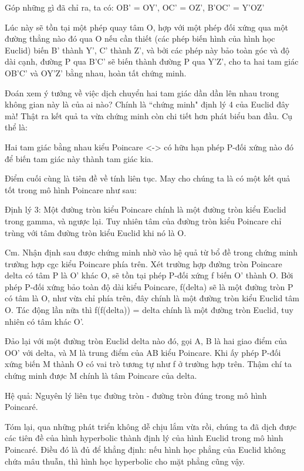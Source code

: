 \begin{multicols}{2}
	Góp những gì đã chỉ ra, ta có: OB' = OY', OC' = OZ', B'OC' = Y'OZ'
	
	Lúc này sẽ tồn tại một phép quay tâm O, hợp với một phép đối xứng qua một đường thẳng nào đó qua O nếu cần thiết (các phép biến hình của hình học Euclid) biến B' thành Y', C' thành Z', và bởi các phép này bảo toàn góc và độ dài cạnh, đường P qua B'C' sẽ biến thành đường P qua Y'Z', cho ta hai tam giác OB'C' và OY'Z' bằng nhau, hoàn tất chứng minh.
	
	Đoán xem ý tưởng về việc dịch chuyển hai tam giác dần dần lên nhau trong không gian này là của ai nào? Chính là ``chứng minh" định lý 4 của Euclid đây mà!
	Thật ra kết quả ta vừa chứng minh còn chi tiết hơn phát biểu ban đầu. Cụ thể là:
	
	Hai tam giác bằng nhau kiểu Poincare <-> có hữu hạn phép P-đối xứng nào đó để biến tam giác này thành tam giác kia.
	
	
	Điểm cuối cùng là tiên đề về tính liên tục. May cho chúng ta là có một kết quả tốt trong mô hình Poincare như sau:
	
	Định lý 3: Một đường tròn kiểu Poincare chính là một đường tròn kiểu Euclid trong gamma, và ngược lại. Tuy nhiên tâm của đường tròn kiểu Poincare chỉ trùng với tâm đường tròn kiểu Euclid khi nó là O.
	
	Cm. Nhận định sau được chứng minh nhờ vào hệ quả từ bổ đề trong chứng minh trường hợp cgc kiểu Poincare phía trên. 
	Xét trường hợp đường tròn Poincare delta có tâm P là O' khác O, sẽ tồn tại phép P-đối xứng f biến O' thành O. Bởi phép P-đối xứng bảo toàn độ dài kiểu Poincare, f(delta) sẽ là một đường tròn P có tâm là O, như vừa chỉ phía trên, đây chính là một đường tròn kiểu Euclid tâm O. Tác động lần nữa thì f(f(delta)) = delta chính là một đường tròn Euclid, tuy nhiên có tâm khác O'.
	
	Đảo lại với một đường tròn Euclid delta nào đó, gọi A, B là hai giao điểm của OO' với delta, và M là trung điểm của AB kiểu Poincare. Khi ấy phép P-đối xứng biến M thành O có vai trò tương tự như f ở trường hợp trên. Thậm chí ta chứng minh được M chính là tâm Poincare của delta.
	
	Hệ quả: Nguyên lý liên tục đường tròn - đường tròn đúng trong mô hình Poincaré.
	
	Tóm lại, qua những phát triển không dễ chịu lắm vừa rồi, chúng ta đã dịch được các tiên đề của hình hyperbolic thành định lý của hình Euclid trong mô hình Poincaré. Điều đó là đủ để khẳng định: nếu hình học phẳng của Euclid không chứa mâu thuẫn, thì hình học hyperbolic cho mặt phẳng cũng vậy.
	

\end{multicols}
